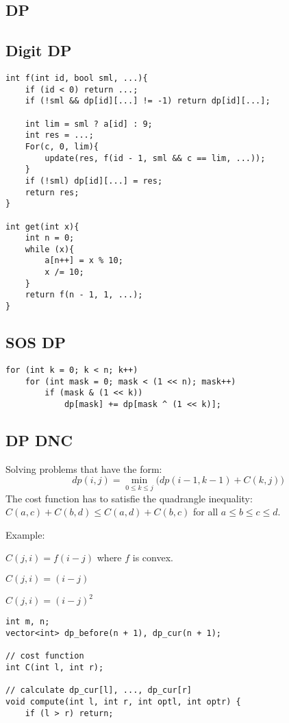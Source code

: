 \documentclass[11pt,a4paper]{article}
\begin{document}
\begin{multicols*}{2}
\section {DP}
\subsection{Digit DP}
\begin{lstlisting}
int f(int id, bool sml, ...){
    if (id < 0) return ...;
    if (!sml && dp[id][...] != -1) return dp[id][...];

    int lim = sml ? a[id] : 9;
    int res = ...;
    For(c, 0, lim){
        update(res, f(id - 1, sml && c == lim, ...));
    }
    if (!sml) dp[id][...] = res;
    return res;
}

int get(int x){
    int n = 0;
    while (x){
        a[n++] = x % 10;
        x /= 10;
    }
    return f(n - 1, 1, ...);
}
\end{lstlisting}

\subsection{SOS DP}
\begin{lstlisting}
for (int k = 0; k < n; k++)
    for (int mask = 0; mask < (1 << n); mask++)
        if (mask & (1 << k)) 
            dp[mask] += dp[mask ^ (1 << k)];
\end{lstlisting}

\subsection{DP DNC}

Solving problems that have the form:
\[
dp(i, j) =
\min\limits_{0 \le k \le j} \Big( dp(i - 1, k - 1) + C(k, j) \Big)
\]
The cost function has to satisfie the quadrangle inequality:
$C(a, c) + C(b, d) \leq C(a, d) + C(b, c)$ for all $a \leq b \leq c \leq d$.

Example:

$C(j, i) = f(i - j)$ where $f$ is convex.

$C(j, i) = (i - j)$

$C(j, i) = (i - j)^2$
\begin{lstlisting}
int m, n;
vector<int> dp_before(n + 1), dp_cur(n + 1);

// cost function
int C(int l, int r);

// calculate dp_cur[l], ..., dp_cur[r]
void compute(int l, int r, int optl, int optr) {
    if (l > r) return;


\end{lstlisting}
\end{multicols*}
\end{document}
